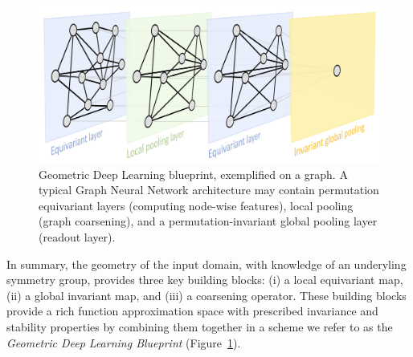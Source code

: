 \begin{figure}
    \centering
    \includegraphics[width=1\textwidth]{figures/blueprint.png}
    \caption{Geometric Deep Learning blueprint, exemplified on a graph. A typical Graph Neural Network architecture may contain permutation equivariant layers (computing node-wise features), local pooling (graph coarsening), and a permutation-invariant global pooling layer (readout layer). }
    \label{fig:blueprint}
\end{figure}

In summary, the geometry of the input domain, with knowledge of an underyling symmetry group, provides three key building blocks: (i) a local equivariant map, (ii) a global invariant map, and (iii) a coarsening operator. These building blocks provide a rich function approximation space with prescribed invariance and stability properties by combining them together in a scheme we refer to as the  
%
\emph{Geometric Deep Learning Blueprint} (Figure~\ref{fig:blueprint}). 
%
%



    

